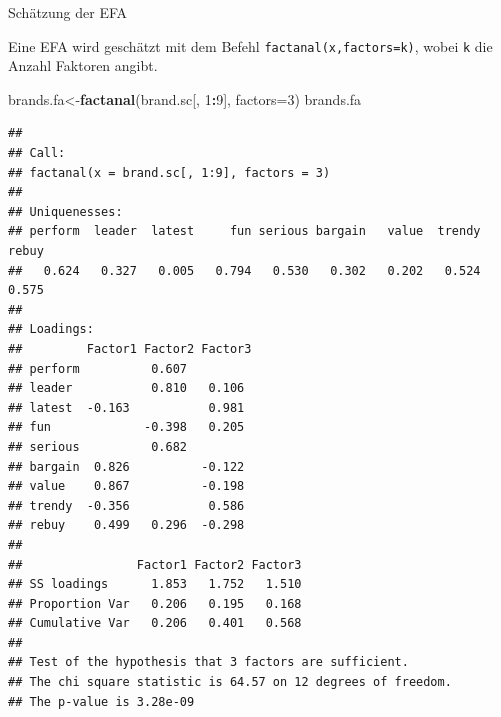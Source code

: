 \documentclass[12pt,ngerman,a4paper,ignorenonframetext,]{beamer}
\newenvironment{Shaded}{\begin{snugshade}}{\end{snugshade}}
\newcommand{\DataTypeTok}[1]{\textcolor[rgb]{0.13,0.29,0.53}{#1}}
\newcommand{\DecValTok}[1]{\textcolor[rgb]{0.00,0.00,0.81}{#1}}
\newcommand{\KeywordTok}[1]{\textcolor[rgb]{0.13,0.29,0.53}{\textbf{#1}}}
\newcommand{\NormalTok}[1]{#1}
\newcommand{\OperatorTok}[1]{\textcolor[rgb]{0.81,0.36,0.00}{\textbf{#1}}}
\begin{document}
\begin{frame}{Schätzung der EFA}
\protect\hypertarget{schatzung-der-efa}{}

Eine EFA wird geschätzt mit dem Befehl \texttt{factanal(x,factors=k)},
wobei \texttt{k} die Anzahl Faktoren angibt.

\begin{Shaded}
\begin{Highlighting}[]
\NormalTok{brands.fa<-}\KeywordTok{factanal}\NormalTok{(brand.sc[, }\DecValTok{1}\OperatorTok{:}\DecValTok{9}\NormalTok{], }\DataTypeTok{factors=}\DecValTok{3}\NormalTok{)}
\NormalTok{brands.fa}
\end{Highlighting}
\end{Shaded}

\begin{verbatim}
## 
## Call:
## factanal(x = brand.sc[, 1:9], factors = 3)
## 
## Uniquenesses:
## perform  leader  latest     fun serious bargain   value  trendy   rebuy 
##   0.624   0.327   0.005   0.794   0.530   0.302   0.202   0.524   0.575 
## 
## Loadings:
##         Factor1 Factor2 Factor3
## perform          0.607         
## leader           0.810   0.106 
## latest  -0.163           0.981 
## fun             -0.398   0.205 
## serious          0.682         
## bargain  0.826          -0.122 
## value    0.867          -0.198 
## trendy  -0.356           0.586 
## rebuy    0.499   0.296  -0.298 
## 
##                Factor1 Factor2 Factor3
## SS loadings      1.853   1.752   1.510
## Proportion Var   0.206   0.195   0.168
## Cumulative Var   0.206   0.401   0.568
## 
## Test of the hypothesis that 3 factors are sufficient.
## The chi square statistic is 64.57 on 12 degrees of freedom.
## The p-value is 3.28e-09
\end{verbatim}

\end{frame}
\end{document}
